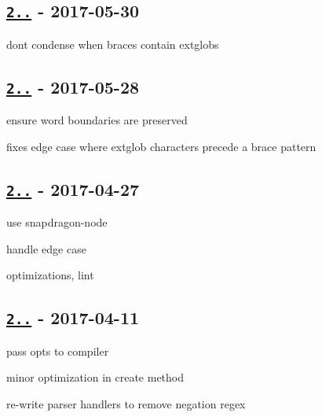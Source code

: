 \subsection*{\href{https://github.com/micromatch/braces/compare/2.2.0...2.2.1}{\tt 2..} -\/ 2017-\/05-\/30}


\begin{DoxyItemize}
\item don\textquotesingle{}t condense when braces contain extglobs
\end{DoxyItemize}

\subsection*{\href{https://github.com/micromatch/braces/compare/2.1.1...2.2.0}{\tt 2..} -\/ 2017-\/05-\/28}


\begin{DoxyItemize}
\item ensure word boundaries are preserved
\item fixes edge case where extglob characters precede a brace pattern
\end{DoxyItemize}

\subsection*{\href{https://github.com/micromatch/braces/compare/2.1.0...2.1.1}{\tt 2..} -\/ 2017-\/04-\/27}


\begin{DoxyItemize}
\item use snapdragon-\/node
\item handle edge case
\item optimizations, lint
\end{DoxyItemize}

\subsection*{\href{https://github.com/micromatch/braces/compare/2.0.3...2.0.4}{\tt 2..} -\/ 2017-\/04-\/11}


\begin{DoxyItemize}
\item pass opts to compiler
\item minor optimization in create method
\item re-\/write parser handlers to remove negation regex
\end{DoxyItemize}

